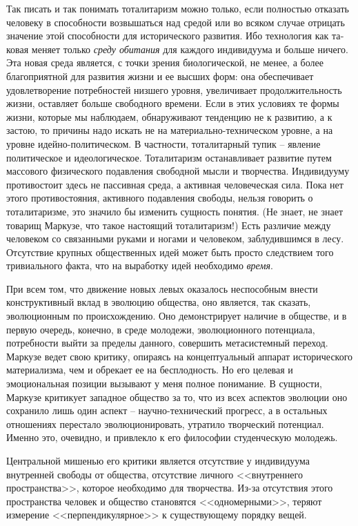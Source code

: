\documentclass{book}
\begin{document}
Так писать и так понимать тоталитаризм можно только, ес­ли полностью отказать человеку в способности возвышаться над средой или во всяком случае отрицать значение этой спо­собности для исторического развития. Ибо технология как та­ковая меняет только \textit{среду обитания}  для каждого индивиду­ума и больше ничего. Эта новая среда является, с точки зрения биологической, не менее, а более благоприятной для развития жизни и ее высших форм: она обеспечивает удовлетворение потребностей низшего уровня, увеличивает продолжительность жизни, оставляет больше свободного времени. Если в этих ус­ловиях те формы жизни, которые мы наблюдаем, обнаружи­вают тенденцию не к развитию, а к застою, то причины надо ис­кать не на материально-техническом уровне, а на уровне идей­но-политическом. В частности, тоталитарный тупик -- явление политическое и идеологическое. Тоталитаризм останавливает развитие путем массового физического подавления свободной мысли и творчества. Индивидууму противостоит здесь не пассив­ная среда, а активная 
человеческая сила. Пока нет этого проти­востояния, активного подавления свободы, нельзя говорить о тоталитаризме, это значило бы изменить сущность понятия. (Не знает, не знает товарищ Маркузе, что такое настоящий то­талитаризм!) Есть различие между человеком со связанными руками и ногами и человеком, заблудившимся в лесу. Отсутст­вие крупных общественных идей может быть просто следстви­ем того тривиального факта, что на выработку идей необхо­димо \textit{время}. 

При всем том, что движение новых левых оказалось неспо­собным внести конструктивный вклад в эволюцию общества, оно является, так сказать, эволюционным по происхождению. Оно демонстрирует наличие в обществе, и в первую очередь, конечно, в среде молодежи, эволюционного потенциала, потребности выйти за пределы данного, совершить метасистемный переход. Маркузе ведет свою критику, опираясь на кон­цептуальный аппарат исторического материализма, чем и обре­кает ее на бесплодность. Но его целевая и эмоциональная пози­ции вызывают у меня полное понимание. В сущности, Маркузе критикует западное общество за то, что из всех аспектов эво­люции оно сохранило лишь один аспект -- научно-технический прогресс, а в остальных отношениях перестало эволюциони­ровать, утратило творческий потенциал. Именно это, очевид­но, и привлекло к его философии студенческую молодежь.

Центральной мишенью его критики является отсутствие у индивидуума внутренней свободы от общества, отсутствие лич­ного <<внутреннего пространства>>, которое необходимо для творчества. Из-за отсутствия этого пространства человек и об­щество становятся <<одномерными>>, теряют измерение <<пер­пендикулярное>> к существующему порядку вещей.
\end{document}
